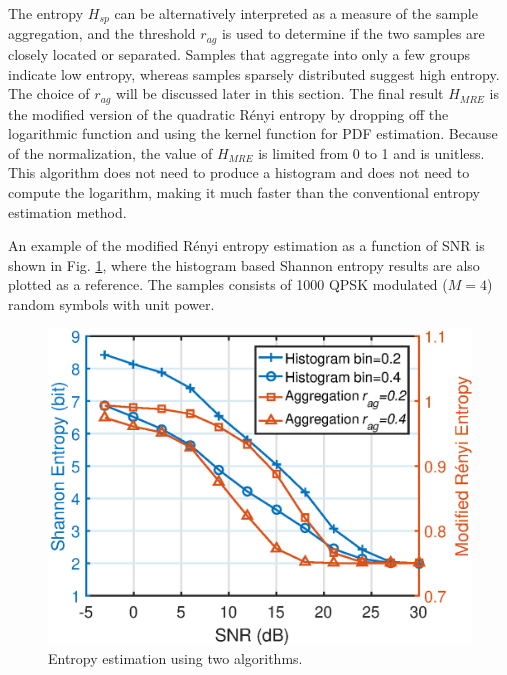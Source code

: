 \documentclass[journal,comsoc,onecolumn, 12pt,draftclsnofoot]{IEEEtran}
\begin{document}
The entropy \(H_{sp}\) can be alternatively interpreted as a measure of the sample aggregation,
and the threshold \(r_{ag}\) is used to determine if the two samples are closely located or separated.
Samples that aggregate into only a few groups indicate low entropy, whereas samples sparsely distributed suggest high entropy.
The choice of \(r_{ag}\) will be discussed later in this section.
The final result \(H_{MRE}\) is the modified version of the quadratic R\'enyi entropy  by dropping off the logarithmic function and using the kernel function for PDF estimation.
Because of the normalization, the value of $H_{MRE}$ is limited from 0 to 1 and is unitless.
This algorithm does not need to produce a histogram and does not need to compute the logarithm, making it much faster than the conventional entropy estimation method.


An example of the modified R\'enyi entropy estimation as a function of SNR is shown in Fig. \ref{fig:MRE}, where the histogram based Shannon entropy results are also plotted as a reference.
The samples consists of 1000 QPSK modulated (\(M=4\)) random symbols with unit power.

\begin{figure}[ht]
\centering
\includegraphics[width=3 in]{pic/H_MR.eps}
\caption{Entropy estimation using two algorithms.}
\label{fig:MRE} 
\end{figure}
\end{document}
